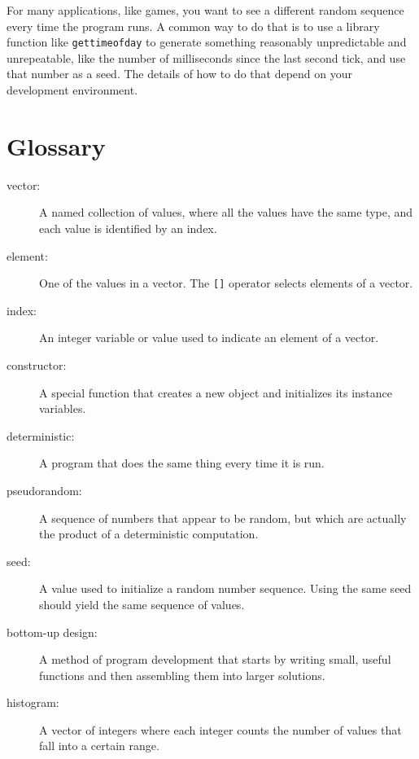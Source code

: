 For many applications, like games, you want to see a different
random sequence every time the program runs.  A common way to
do that is to use a library function like {\tt gettimeofday}
to generate something reasonably unpredictable
and unrepeatable, like the number of milliseconds since the
last second tick, and use that number as a seed.  The details
of how to do that depend on your development environment.

\section{Glossary}

\begin{description}

\item[vector:]  A named collection of values, where all the
values have the same type, and each value is identified by
an index.

\item[element:]  One of the values in a vector.  The {\tt []}
operator selects elements of a vector.

\item[index:]  An integer variable or value used to indicate
an element of a vector.

\item[constructor:]  A special function that creates a new
object and initializes its instance variables.

\item[deterministic:]  A program that does the same thing every
time it is run.

\item[pseudorandom:]  A sequence of numbers that appear to be
random, but which are actually the product of a deterministic
computation.

\item[seed:]  A value used to initialize a random number sequence.
Using the same seed should yield the same sequence of values.

\item[bottom-up design:]  A method of program development that
starts by writing small, useful functions and then assembling
them into larger solutions.

\item[histogram:]  A vector of integers where each integer
counts the number of values that fall into a certain range.


\end{description}
